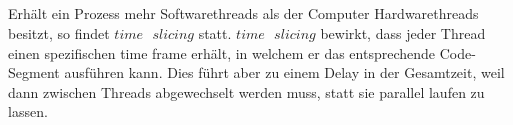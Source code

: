 \documentclass[a4paper, 11pt]{article}
\begin{document}
      \subsection*{}
      Erhält ein Prozess mehr Softwarethreads als der Computer Hardwarethreads besitzt, so findet $time \mbox{ } slicing$ statt. $time \mbox{ } slicing$ bewirkt, dass jeder Thread einen spezifischen time frame erhält, in welchem er das entsprechende Code-Segment ausführen kann. Dies führt aber zu einem Delay in der Gesamtzeit, weil dann zwischen Threads abgewechselt werden muss, statt sie parallel laufen zu lassen.
\end{document}
